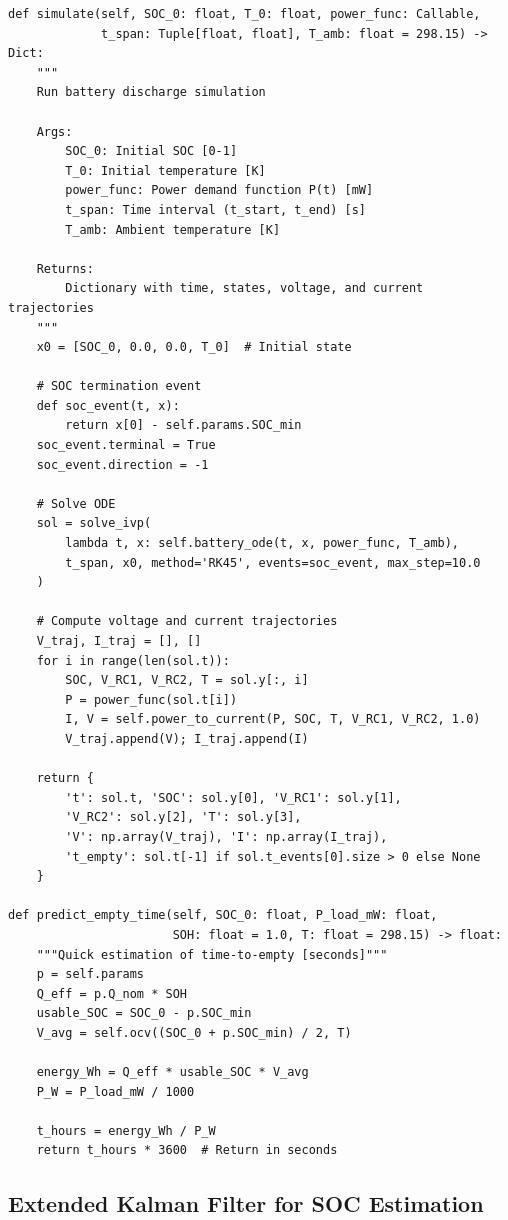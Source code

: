 \begin{lstlisting}[caption={Simulation and Time-to-Empty Prediction}, label={lst:sim}]
def simulate(self, SOC_0: float, T_0: float, power_func: Callable,
             t_span: Tuple[float, float], T_amb: float = 298.15) -> Dict:
    """
    Run battery discharge simulation
    
    Args:
        SOC_0: Initial SOC [0-1]
        T_0: Initial temperature [K]
        power_func: Power demand function P(t) [mW]
        t_span: Time interval (t_start, t_end) [s]
        T_amb: Ambient temperature [K]
    
    Returns:
        Dictionary with time, states, voltage, and current trajectories
    """
    x0 = [SOC_0, 0.0, 0.0, T_0]  # Initial state
    
    # SOC termination event
    def soc_event(t, x):
        return x[0] - self.params.SOC_min
    soc_event.terminal = True
    soc_event.direction = -1
    
    # Solve ODE
    sol = solve_ivp(
        lambda t, x: self.battery_ode(t, x, power_func, T_amb),
        t_span, x0, method='RK45', events=soc_event, max_step=10.0
    )
    
    # Compute voltage and current trajectories
    V_traj, I_traj = [], []
    for i in range(len(sol.t)):
        SOC, V_RC1, V_RC2, T = sol.y[:, i]
        P = power_func(sol.t[i])
        I, V = self.power_to_current(P, SOC, T, V_RC1, V_RC2, 1.0)
        V_traj.append(V); I_traj.append(I)
    
    return {
        't': sol.t, 'SOC': sol.y[0], 'V_RC1': sol.y[1],
        'V_RC2': sol.y[2], 'T': sol.y[3],
        'V': np.array(V_traj), 'I': np.array(I_traj),
        't_empty': sol.t[-1] if sol.t_events[0].size > 0 else None
    }

def predict_empty_time(self, SOC_0: float, P_load_mW: float,
                       SOH: float = 1.0, T: float = 298.15) -> float:
    """Quick estimation of time-to-empty [seconds]"""
    p = self.params
    Q_eff = p.Q_nom * SOH
    usable_SOC = SOC_0 - p.SOC_min
    V_avg = self.ocv((SOC_0 + p.SOC_min) / 2, T)
    
    energy_Wh = Q_eff * usable_SOC * V_avg
    P_W = P_load_mW / 1000
    
    t_hours = energy_Wh / P_W
    return t_hours * 3600  # Return in seconds
\end{lstlisting}

\subsection{Extended Kalman Filter for SOC Estimation}

